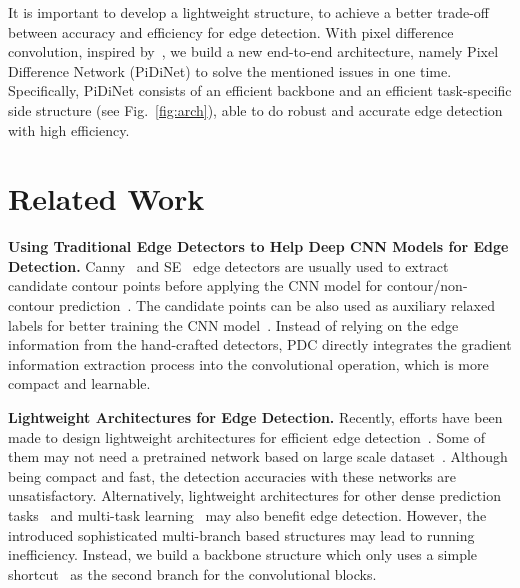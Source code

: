 \documentclass[10pt,twocolumn,letterpaper]{article}
\begin{document}
It is important to develop a lightweight structure, to achieve a better trade-off between accuracy and efficiency for edge detection. With pixel difference convolution, inspired by~\cite{he2016residual,howard2017mobilenets}, we build a new end-to-end architecture, namely Pixel Difference Network (PiDiNet) to solve the mentioned issues in one time. Specifically, PiDiNet consists of an efficient backbone and an efficient task-specific side structure (see Fig.~\ref{fig:arch}), able to do robust and accurate edge detection with high efficiency.


\section{Related Work}


\noindent \textbf{Using Traditional Edge Detectors to Help Deep CNN Models for Edge Detection.} \quad Canny~\cite{canny1986computational} and SE~\cite{dollar2014se} edge detectors are usually used to extract candidate contour points before applying the CNN model for contour/non-contour prediction~\cite{bertasius2015deepedge, bertasius2015hfl}. The candidate points can be also used as auxiliary relaxed labels for better training the CNN model~\cite{liu2016relaxed}. Instead of relying on the edge information from the hand-crafted detectors, PDC directly integrates the gradient information extraction process into the convolutional operation, which is more compact and learnable.

\vspace{0.3em}
\noindent \textbf{Lightweight Architectures for Edge Detection.} \quad Recently, efforts have been made to design lightweight architectures for efficient edge detection~\cite{wibisono2020fined,wibisono2020traditional,poma2020dense}. Some of them may not need a pretrained network based on large scale dataset~\cite{poma2020dense}. Although being compact and fast, the detection accuracies with these networks are unsatisfactory. Alternatively, lightweight architectures for other dense prediction tasks~\cite{gao2020100k,wu2020cgnet,paszke2016enet,li2019dabnet,mehta2019espnetv2,yu2018bisenet} and multi-task learning~\cite{kokkinos2017ubernet, liu2020dynamicintegration} may also benefit edge detection. However, the introduced sophisticated multi-branch based structures may lead to running inefficiency. Instead, we build a backbone structure which only uses a simple shortcut~\cite{he2016residual} as the second branch for the convolutional blocks.
\end{document}
